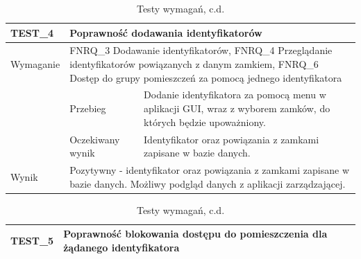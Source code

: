         \pagebreak  

        \begin{table}[h!]
            \ContinuedFloat
            \caption{Testy wymagań, c.d.}
            \begin{subtable}[c]{\textwidth}
                \centering
                    \begin{tabular}{|p{2cm}|p{}|p{}|}
                    \hline
                    TEST\_4               & \multicolumn{2}{l|}{\textbf{Poprawność dodawania identyfikatorów}}                                                            \\ \hline
                    \cellcolor[gray]{0.8} Wymaganie             & \multicolumn{2}{p{12cm}|}{FNRQ\_3 Dodawanie identyfikatorów, FNRQ\_4 Przeglądanie identyfikatorów powiązanych z danym zamkiem, FNRQ\_6 Dostęp do grupy pomieszczeń za pomocą jednego identyfikatora }                                                                                    \\ \hline
                    \cellcolor[gray]{0.8} \multirow{2}{*}{Opis} & Przebieg           & Dodanie identyfikatora za pomocą menu w aplikacji GUI, wraz z wyborem zamków, do których będzie upoważniony.  \\ \cline{2-3} 
                    \cellcolor[gray]{0.8}                      & Oczekiwany wynik   & Identyfikator oraz powiązania z zamkami zapisane w bazie danych.                                                 \\ \hline
                    \cellcolor[gray]{0.8} Wynik                 & \multicolumn{2}{p{12cm}|}{Pozytywny - identyfikator oraz powiązania z zamkami zapisane w bazie danych. Możliwy podgląd danych z aplikacji zarządzającej.}                                                                                  \\ \hline
                    \end{tabular}%
                \label{tbl:test4}
                \vspace{10mm}           
            \end{subtable}
        \quad%
            \begin{subtable}[c]{\textwidth}
                \centering
                    \begin{tabular}{|p{2cm}|p{}|p{}|}
                    \hline
                    TEST\_5               & \multicolumn{2}{p{12cm}|}{\textbf{Poprawność blokowania dostępu do pomieszczenia dla żądanego identyfikatora}}                                                            \\ \hline

\end{tabular}
\end{subtable}
\end{table}
